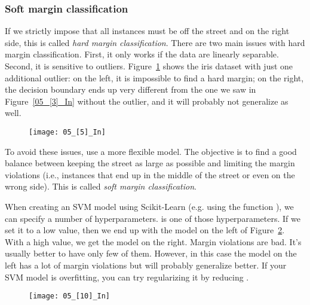 \subsubsection{Soft margin classification}
If we strictly impose that all instances must be off the street and on the right side, this is called \emph{hard margin classification}. There are two main issues with hard margin classification. First, it only works if the data are linearly separable. Second, it is sensitive to outliers. Figure~\ref{05_[5]_In} shows the iris dataset with just one additional outlier: on the left, it is impossible to find a hard margin; on the right, the decision boundary ends up very different from the one we saw in Figure~\ref{05_[3]_In} without the outlier, and it will probably not generalize as well.
\begin{figure}[h!t]
\centering
\texttt{[image: 05\_[5]\_In]}
\caption{}\label{05_[5]_In}
\end{figure}

To avoid these issues, use a more flexible model. The objective is to find a good balance between keeping the street as large as possible and limiting the margin violations (i.e., instances that end up in the middle of the street or even on the wrong side). This is called \emph{soft margin classification}.

When creating an SVM model using Scikit-Learn (e.g. using the function ), we can specify a number of hyperparameters.  is one of those hyperparameters. If we set it to a low value, then we end up with the model on the left of Figure~\ref{05_[10]_In}. With a high value, we get the model on the right. Margin violations are bad. It's usually better to have only few of them. However, in this case the model on the left has a lot of margin violations but will probably generalize better. If your SVM model is overfitting, you can try regularizing it by reducing .
\begin{figure}[h!t]
\centering
\texttt{[image: 05\_[10]\_In]}
\caption{}\label{05_[10]_In}
\end{figure}
